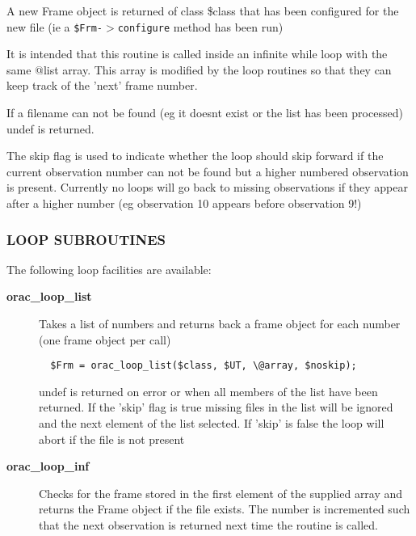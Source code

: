 \begin{description}
A new  Frame object is returned of class \$class that has been configured
for the new file (ie a \texttt{\$Frm-$>$configure} method has been run)



It is intended that this routine is called inside an infinite while
loop with the same @list array. This array is modified by the loop
routines so that they can keep track of the 'next' frame number.



If a filename can not be found (eg it doesnt exist or the list has
been processed) undef is returned.



The skip flag is used to indicate whether the loop should skip
forward if the current observation number can not be found
but a higher numbered observation is present. Currently no loops
will go back to missing observations if they appear after a higher
number (eg observation 10 appears before observation 9!)

\subsubsection*{LOOP SUBROUTINES\label{ORAC::Loop_LOOP_SUBROUTINES}}


The following loop facilities are available:

\begin{description}

\item[{\textbf{orac\_loop\_list}}] \mbox{}

Takes a list of numbers and returns back a frame object
for each number (one frame object per call)

\begin{verbatim}
  $Frm = orac_loop_list($class, $UT, \@array, $noskip);
\end{verbatim}


undef is returned on error or when all members of the
list have been returned. If the 'skip' flag is true
missing files in the list will be ignored and the next
element of the list selected. If 'skip' is false
the loop will abort if the file is not present


\item[{\textbf{orac\_loop\_inf}}] \mbox{}

Checks for the frame stored in the first element of the supplied array
and returns the Frame object if the file exists. The number is incremented
such that the next observation is returned next time the routine is
called.


\end{description}
\end{description}
